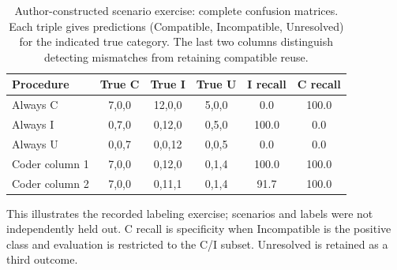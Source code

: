 \begin{table}[t]\centering\footnotesize
\caption{Author-constructed scenario exercise: complete confusion matrices. Each triple gives predictions (Compatible, Incompatible, Unresolved) for the indicated true category. The last two columns distinguish detecting mismatches from retaining compatible reuse.}\label{tab:m1-validity}
\setlength{\tabcolsep}{2pt}
\begin{tabularx}{\columnwidth}{@{}Yccccc@{}}\toprule
Procedure & True C & True I & True U & I recall & C recall\\\midrule
Always C & 7,0,0 & 12,0,0 & 5,0,0 & 0.0 & 100.0\\
Always I & 0,7,0 & 0,12,0 & 0,5,0 & 100.0 & 0.0\\
Always U & 0,0,7 & 0,0,12 & 0,0,5 & 0.0 & 0.0\\
Coder column 1 & 7,0,0 & 0,12,0 & 0,1,4 & 100.0 & 100.0\\
Coder column 2 & 7,0,0 & 0,11,1 & 0,1,4 & 91.7 & 100.0\\
\bottomrule\end{tabularx}
\par\smallskip\raggedright This illustrates the recorded labeling exercise; scenarios and labels were not independently held out. C recall is specificity when Incompatible is the positive class and evaluation is restricted to the C/I subset. Unresolved is retained as a third outcome.
\end{table}
